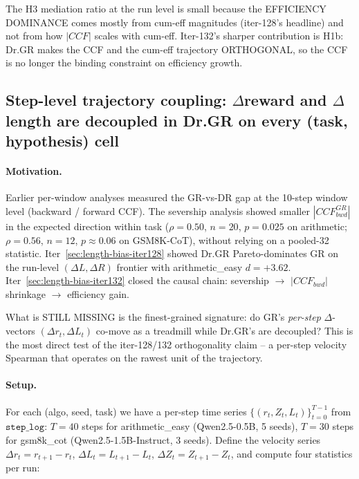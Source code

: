 \documentclass{article}
\begin{document}
The H3 mediation ratio at the run level is small because the
EFFICIENCY DOMINANCE comes mostly from cum-eff magnitudes
(iter-128's headline) and not from how $|CCF|$ scales with cum-eff.
Iter-132's sharper contribution is H1b: Dr.GR makes the CCF and
the cum-eff trajectory ORTHOGONAL, so the CCF is no longer the
binding constraint on efficiency growth.
 

\subsection{Step-level trajectory coupling: $\Delta$reward and $\Delta$length
are decoupled in Dr.GR on every (task, hypothesis) cell}
\label{sec:length-bias-iter136}

\paragraph{Motivation.}
Earlier per-window analyses measured the GR-vs-DR gap at the
10-step window level (backward / forward CCF).
The severship analysis showed smaller $|CCF^{GR}_{bwd}|$ in the expected
direction within task ($\rho=0.50$, $n=20$, $p=0.025$ on arithmetic;
$\rho=0.56$, $n=12$, $p\approx0.06$ on GSM8K-CoT), without relying on a
pooled-32 statistic.
Iter~\ref{sec:length-bias-iter128} showed Dr.GR Pareto-dominates GR on
the run-level $(\Delta L, \Delta R)$ frontier with arithmetic\_easy
$d=+3.62$.
Iter~\ref{sec:length-bias-iter132} closed the causal chain:
severship $\rightarrow$ $|CCF_{bwd}|$ shrinkage $\rightarrow$
efficiency gain.

What is STILL MISSING is the finest-grained signature:
do GR's \emph{per-step} $\Delta$-vectors $({\Delta r_t, \Delta L_t})$
co-move as a treadmill while Dr.GR's are decoupled?
This is the most direct test of the iter-128/132 orthogonality claim
-- a per-step velocity Spearman that operates on the rawest unit of
the trajectory.

\paragraph{Setup.}
For each (algo, seed, task) we have a per-step time series
$\{(r_t, Z_t, L_t)\}_{t=0}^{T-1}$ from $\texttt{step\_log}$:
$T=40$ steps for arithmetic\_easy (Qwen2.5-0.5B, 5 seeds),
$T=30$ steps for gsm8k\_cot (Qwen2.5-1.5B-Instruct, 3 seeds).
Define the velocity series
$\Delta r_t = r_{t+1} - r_t$, $\Delta L_t = L_{t+1} - L_t$,
$\Delta Z_t = Z_{t+1} - Z_t$, and compute four statistics per run:
\end{document}
